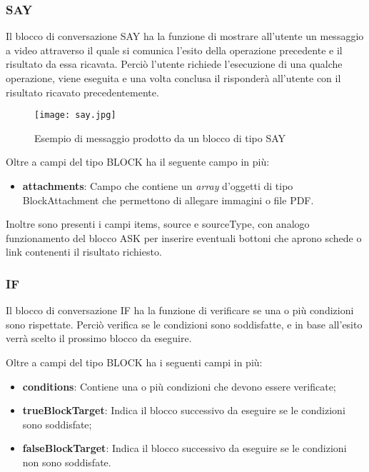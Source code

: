 \subsubsection{SAY}

Il blocco di conversazione SAY ha la funzione di mostrare all'utente un messaggio a video attraverso il quale si comunica l'esito della operazione precedente e il risultato da essa ricavata. Perciò l'utente richiede l'esecuzione di una qualche operazione, viene eseguita e una volta conclusa il  risponderà all'utente con il risultato ricavato precedentemente.

\begin{figure}[htbp]
	\centering
	\texttt{[image: say.jpg]}
	\caption{Esempio di messaggio prodotto da un blocco di tipo SAY}
\end{figure}
Oltre a campi del tipo BLOCK ha il seguente campo in più:

\begin{itemize}
	\item \textbf{attachments}: Campo che contiene un \emph{array} d'oggetti di tipo BlockAttachment che permettono di allegare immagini o file PDF.
\end{itemize}

Inoltre sono presenti i campi items, source e sourceType, con analogo funzionamento del blocco ASK per inserire eventuali bottoni che aprono schede o link contenenti il risultato richiesto.

\subsubsection{IF}

Il blocco di conversazione IF ha la funzione di verificare se una o più condizioni sono rispettate. Perciò verifica se le condizioni sono soddisfatte, e in base all'esito verrà scelto il prossimo blocco da eseguire.

Oltre a campi del tipo BLOCK ha i seguenti campi in più:

\begin{itemize}
	\item \textbf{conditions}: Contiene una o più condizioni che devono essere verificate;
	\item \textbf{trueBlockTarget}: Indica il blocco successivo da eseguire se le condizioni sono soddisfate;
	\item \textbf{falseBlockTarget}: Indica il blocco successivo da eseguire se le condizioni non sono soddisfate.
\end{itemize}


